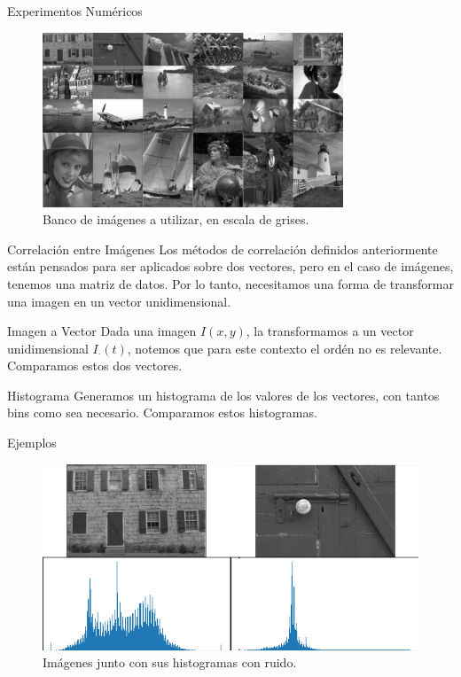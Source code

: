 \documentclass{beamer}
\begin{document}
\begin{frame}{Experimentos Numéricos}
    \begin{figure}[H]
        \centering
        \includegraphics[width=0.8\textwidth]{all_images_grid_bw.png}
        \caption{Banco de im\'agenes a utilizar, en escala de grises.}
    \end{figure}     
\end{frame}

    

\begin{frame}{Correlaci\'on entre Im\'agenes}
    Los métodos de correlación definidos anteriormente están pensados para ser aplicados sobre dos vectores, pero en el caso de imágenes, tenemos una matriz de datos. Por lo tanto, necesitamos una forma de transformar una imagen en un vector unidimensional.
    \begin{block}{Imagen a Vector}
        Dada una imagen $I(x, y)$, la transformamos a un vector unidimensional  $I_{\cdot}(t)$, notemos que para este contexto el ordén no es relevante. Comparamos estos dos vectores.
    \end{block}
    \begin{block}{Histograma}
        Generamos un histograma de los valores de los vectores, con tantos bins como sea necesario. Comparamos estos histogramas.
    \end{block}
\end{frame}

\begin{frame}{Ejemplos}
    \begin{figure}[H]
        \centering
        \includegraphics[width=\textwidth]{img_hist.png}
        \caption{Imágenes junto con sus histogramas con ruido.}
    \end{figure}
\end{frame}
\end{document}
